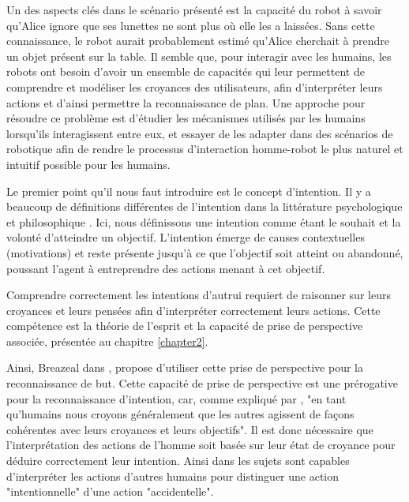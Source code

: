 \documentclass[a4paper,11pt,twoside]{StyleThese}
\begin{document}
Un des aspects clés dans le scénario présenté est la capacité du robot à savoir qu'Alice ignore que ses lunettes ne sont plus où elle les a laissées. Sans cette connaissance, le robot aurait probablement estimé qu'Alice cherchait à prendre un objet présent sur la table. 
Il semble que, pour interagir avec les humains, les robots ont besoin d'avoir un ensemble de capacités qui leur permettent de comprendre et modéliser les croyances des utilisateurs, afin d'interpréter leurs actions et d'ainsi permettre la reconnaissance de plan. Une approche pour résoudre ce problème est d'étudier les mécanismes utilisés par les humains lorsqu'ils interagissent entre eux, et essayer de les adapter dans des scénarios de robotique afin de rendre le processus d'interaction homme-robot le plus naturel et intuitif possible pour les humains.

Le premier point qu'il nous faut introduire est le concept d'intention. Il y a beaucoup de définitions différentes de l'intention dans la littérature psychologique  \cite{bruner1981} et philosophique \cite{bratman1984}. Ici, nous définissons une intention comme étant le souhait et la volonté d'atteindre un objectif. L'intention émerge de causes contextuelles (motivations) et reste présente jusqu'à ce que l'objectif soit atteint ou abandonné, poussant l'agent à entreprendre des actions menant à cet objectif.

Comprendre correctement les intentions d'autrui requiert de raisonner sur leurs croyances et leurs pensées afin d'interpréter correctement leurs actions. Cette compétence est la théorie de l'esprit et la capacité de prise de perspective associée, présentée au chapitre \ref{chapter2}.

Ainsi, Breazeal dans \cite{BreazealGB09}, propose d'utiliser cette prise de perspective pour la reconnaissance de but. Cette capacité de prise de perspective est une prérogative pour la reconnaissance d'intention, car, comme expliqué par \cite{byom2013theory}, "en tant qu'humains nous croyons généralement que les autres agissent de façons cohérentes avec leurs croyances et leurs objectifs". Il est donc nécessaire que l'interprétation des actions de l'homme soit basée sur leur état de croyance pour déduire correctement leur intention. Ainsi dans \cite{Call1998} les sujets sont capables d'interpréter les actions d'autres humains pour distinguer une action "intentionnelle" d'une action "accidentelle".
\end{document}

